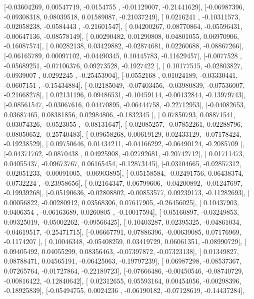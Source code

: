 \documentclass{article}
\begin{document}
       [-0.03604269,  0.00547719, -0.0154755 , -0.01129007, -0.21441629],
       [-0.06987396, -0.09308318,  0.08039518,  0.01589087, -0.21037249],
       [ 0.0216241 , -0.10311573, -0.02058238, -0.0584443 , -0.21601547],
       [ 0.04200267,  0.08770864, -0.05596431, -0.00647136, -0.08578149],
       [ 0.00290482,  0.01290808,  0.04801055,  0.06970906, -0.16087574],
       [ 0.00282138,  0.03429882, -0.02874681,  0.02260688, -0.08867266],
       [-0.06165789,  0.00097102, -0.04490345,  0.10445783, -0.11629457],
       [-0.0077528 , -0.05689251, -0.07106376,  0.09273528, -0.1927422 ],
       [ 0.10177515, -0.02803827, -0.0939007 ,  0.0292245 , -0.25453904],
       [-0.0552168 ,  0.01024189, -0.03330441, -0.0607151 , -0.15434884],
       [-0.02185049, -0.07403456, -0.03980839, -0.07536007, -0.21668278],
       [ 0.02131196,  0.09486531, -0.10459114, -0.00132844, -0.13979743],
       [-0.08561547, -0.03067616,  0.04470895, -0.06444758, -0.22712953],
       [-0.04082653,  0.03687465,  0.08381856,  0.02984806, -0.1832345 ],
       [ 0.07850793,  0.08871541, -0.03074326, -0.0523055 , -0.08131647],
       [-0.02085257, -0.07852261,  0.02288796, -0.08050652, -0.25740483],
       [ 0.09658268,  0.00619129,  0.02433129, -0.07178424, -0.19238529],
       [ 0.09750646,  0.01434211, -0.04166292, -0.06490124, -0.2085709 ],
       [-0.04371762, -0.0870438 ,  0.04925908, -0.02792681, -0.20742712],
       [ 0.01711473,  0.04055437, -0.09673767,  0.06165454, -0.12873145],
       [-0.03104665, -0.02857312, -0.02051233, -0.00091005, -0.06903895],
       [ 0.05158584, -0.02491756,  0.06438374, -0.0732224 , -0.23958656],
       [-0.02164347,  0.06799606, -0.04200892, -0.01247697, -0.19939268],
       [-0.05190636, -0.02808802, -0.00853577,  0.09239173, -0.11282693],
       [ 0.00056822, -0.00280912,  0.03568306,  0.07617905, -0.26456025],
       [ 0.10437903,  0.0406354 , -0.06163689,  0.0260805 , -0.10017594],
       [ 0.05160897, -0.03249853,  0.09325019, -0.05002262, -0.09566425],
       [ 0.10403287,  0.02395325, -0.04861034, -0.04619517, -0.25471715],
       [-0.06667791,  0.07886396, -0.00639085,  0.07176969, -0.1174207 ],
       [ 0.10046348, -0.05408259,  0.03419729,  0.06061351, -0.08990729],
       [ 0.09405492,  0.04055299,  0.08356463, -0.07397872, -0.07323138],
       [ 0.01349827,  0.08788471,  0.04565191, -0.06425063, -0.19797239],
       [ 0.06987298, -0.08537367,  0.07265764, -0.01727864, -0.22189723],
       [-0.07666486, -0.00450546, -0.08740729, -0.00816422, -0.12840642],
       [ 0.02312655,  0.05593164,  0.00454056, -0.00298396, -0.18925839],
       [-0.05494755,  0.0024236 , -0.06190182, -0.07128619, -0.14437284],
\end{document}
